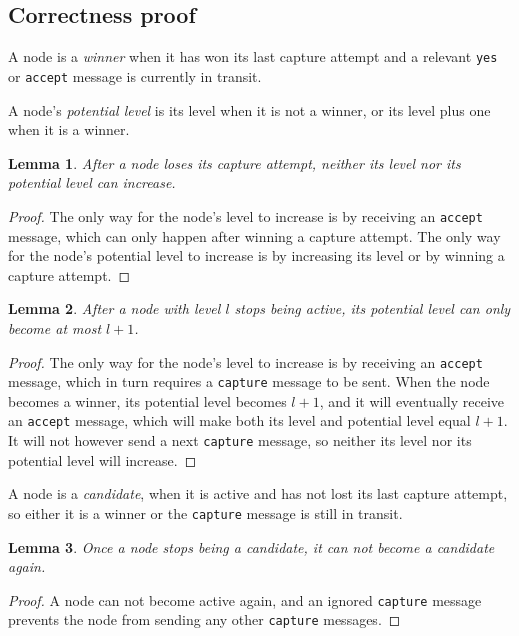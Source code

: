 \documentclass[a4paper,12pt]{article}
\newtheorem{lemma}{Lemma}
\newcommand{\tcapture}{\texttt{capture}\xspace}
\newcommand{\taccept}{\texttt{accept}\xspace}
\newcommand{\tyes}{\texttt{yes}\xspace}
\begin{document}
\subsection*{Correctness proof}

A node is a \emph{winner} when it has won its last capture attempt
and a relevant \tyes or \taccept message is currently in transit.

A node's \emph{potential level}
is its level when it is not a winner,
or its level plus one when it is a winner.

\begin{lemma}\label{lost-capture}
    After a node loses its capture attempt,
    neither its level nor its potential level can increase.
\end{lemma}
\begin{proof}
    The only way for the node's level to increase is by receiving an \taccept message,
    which can only happen after winning a capture attempt.
    The only way for the node's potential level to increase
    is by increasing its level or by winning a capture attempt.
\end{proof}

\begin{lemma}\label{defeated}
    After a node with level $l$ stops being active,
    its potential level can only become at most $l + 1$.
\end{lemma}
\begin{proof}
    The only way for the node's level to increase is by receiving an \taccept message,
    which in turn requires a \tcapture message to be sent.
    When the node becomes a winner, its potential level becomes $l + 1$,
    and it will eventually receive an \taccept message,
    which will make both its level and potential level equal $l + 1$.
    It will not however send a next \tcapture message,
    so neither its level nor its potential level will increase.
\end{proof}

A node is a \emph{candidate},
when it is active and has not lost its last capture attempt,
so either it is a winner or the \tcapture message is still in transit.

\begin{lemma}\label{no-candidate-again}
    Once a node stops being a candidate, it can not become a candidate again.
\end{lemma}
\begin{proof}
    A node can not become active again, and an ignored \tcapture message
    prevents the node from sending any other \tcapture messages.
\end{proof}
\end{document}
